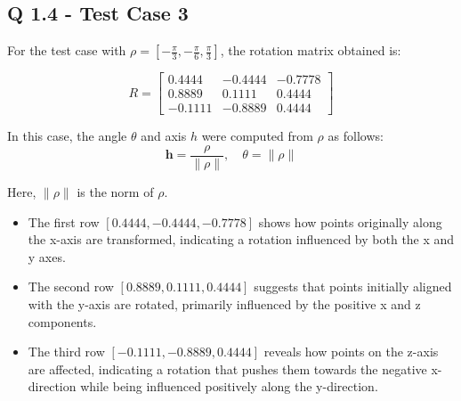 \subsection{Q 1.4 -  Test Case 3}
For the test case with \(\rho = [-\frac{\pi}{3}, -\frac{\pi}{6}, \frac{\pi}{3}]\), the rotation matrix obtained is:

\[
R = \begin{bmatrix}
0.4444 & -0.4444 & -0.7778 \\
0.8889 & 0.1111 & 0.4444 \\
-0.1111 & -0.8889 & 0.4444
\end{bmatrix}
\]

In this case, the angle \(\theta\) and axis \(h\) were computed from \(\rho\) as follows:
\begin{equation}
\mathbf{h} = \frac{\rho}{\|\rho\|}, \quad \theta = \|\rho\|
\end{equation}

Here, \( \|\rho\| \) is the norm of \( \rho \).

\begin{itemize}
    \item The first row \([0.4444, -0.4444, -0.7778]\) shows how points originally along the x-axis are transformed, indicating a rotation influenced by both the x and y axes.
    \item The second row \([0.8889, 0.1111, 0.4444]\) suggests that points initially aligned with the y-axis are rotated, primarily influenced by the positive x and z components.
    \item The third row \([-0.1111, -0.8889, 0.4444]\) reveals how points on the z-axis are affected, indicating a rotation that pushes them towards the negative x-direction while being influenced positively along the y-direction.
\end{itemize}

